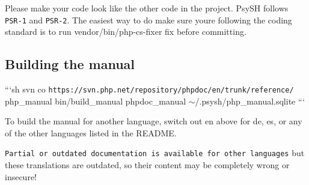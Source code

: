 Please make your code look like the other code in the project. Psy\+S\+H follows {\tt P\+S\+R-\/1} and {\tt P\+S\+R-\/2}. The easiest way to do make sure you\textquotesingle{}re following the coding standard is to run {\ttfamily vendor/bin/php-\/cs-\/fixer fix} before committing.

\subsection*{Building the manual}

```sh svn co {\tt https\+://svn.\+php.\+net/repository/phpdoc/en/trunk/reference/} php\+\_\+manual bin/build\+\_\+manual phpdoc\+\_\+manual $\sim$/.psysh/php\+\_\+manual.\+sqlite ```

To build the manual for another language, switch out {\ttfamily en} above for {\ttfamily de}, {\ttfamily es}, or any of the other languages listed in the R\+E\+A\+D\+M\+E.

{\tt Partial or outdated documentation is available for other languages} but these translations are outdated, so their content may be completely wrong or insecure! 